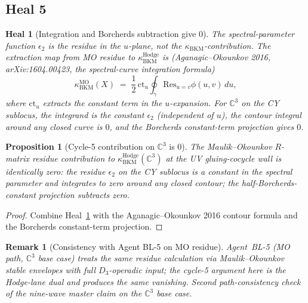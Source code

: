 \documentclass[11pt]{article}
\newtheorem{proposition}[theorem]{Proposition}
\newtheorem{remark}[theorem]{Remark}
\newtheorem{heal}[theorem]{Heal}
\providecommand{\C}{\mathbb{C}}
\providecommand{\kBKM}{\kappa_{\mathrm{BKM}}}
\begin{document}
\subsection{Heal 5}
\label{subsec:bl1-heal-5}

\begin{heal}[Integration and Borcherds subtraction give $0$]
\label{heal:bl1-5}
The spectral-parameter function $\epsilon_2$ is the residue in the
$u$-plane, not the $\kBKM$-contribution. The extraction map from MO
residue to $\kBKM^{\mathrm{Hodge}}$ is (Aganagic--Okounkov 2016,
arXiv:1604.00423, the spectral-curve integration formula)
\begin{equation}
  \kBKM^{\mathrm{MO}}(X)
  \;=\; \frac{1}{2}\, \mathrm{ct}_{u} \oint_\gamma
  \mathrm{Res}_{u=v} \phi(u,v)\, du,
\end{equation}
where $\mathrm{ct}_u$ extracts the constant term in the $u$-expansion.
For $\C^3$ on the CY sublocus, the integrand is the constant $\epsilon_2$
(independent of $u$), the contour integral around any closed curve is
$0$, and the Borcherds constant-term projection gives $0$.
\end{heal}

\begin{proposition}[Cycle-5 contribution on $\C^3$ is $0$]
\label{prop:bl1-cycle-5}
The Maulik--Okounkov $R$-matrix residue contribution to
$\kBKM^{\mathrm{Hodge}}(\C^3)$ at the UV gluing-cocycle wall is
identically zero: the residue $\epsilon_2$ on the CY sublocus is a
constant in the spectral parameter and integrates to zero around any
closed contour; the half-Borcherds-constant projection subtracts zero.
\end{proposition}

\begin{proof}
Combine Heal~\ref{heal:bl1-5} with the Aganagic--Okounkov 2016 contour
formula and the Borcherds constant-term projection.
\end{proof}

\begin{remark}[Consistency with Agent BL-5 on MO residue]
\label{rem:bl1-agent-bl5-consistency}
Agent~BL-5 (MO path, $\C^3$ base case) treats the same residue
calculation via Maulik--Okounkov stable envelopes with full
$D_3$-operadic input; the cycle-5 argument here is the Hodge-lane
dual and produces the same vanishing. Second path-consistency check of
the nine-wave master claim on the $\C^3$ base case.
\end{remark}
\end{document}
